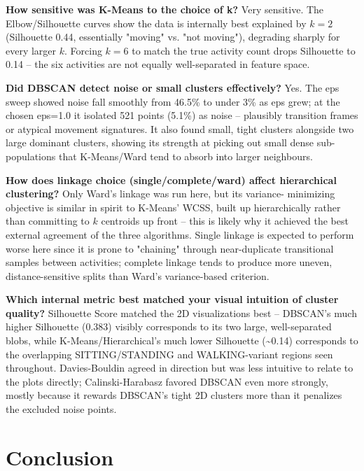 \documentclass[12pt,a4paper]{article}
\begin{document}
\textbf{How sensitive was K-Means to the choice of k?} Very sensitive. The
Elbow/Silhouette curves show the data is internally best explained by
\(k=2\) (Silhouette 0.44, essentially "moving" vs. "not moving"),
degrading sharply for every larger \(k\). Forcing \(k=6\) to match the true
activity count drops Silhouette to 0.14 -- the six activities are not
equally well-separated in feature space.

\textbf{Did DBSCAN detect noise or small clusters effectively?} Yes. The eps
sweep showed noise fall smoothly from 46.5\% to under 3\% as eps grew; at
the chosen eps=1.0 it isolated 521 points (5.1\%) as noise -- plausibly
transition frames or atypical movement signatures. It also found small,
tight clusters alongside two large dominant clusters, showing its
strength at picking out small dense sub-populations that K-Means/Ward
tend to absorb into larger neighbours.

\textbf{How does linkage choice (single/complete/ward) affect hierarchical
clustering?} Only Ward's linkage was run here, but its variance-
minimizing objective is similar in spirit to K-Means' WCSS, built up
hierarchically rather than committing to \(k\) centroids up front -- this
is likely why it achieved the best external agreement of the three
algorithms. Single linkage is expected to perform worse here since it is
prone to "chaining" through near-duplicate transitional samples between
activities; complete linkage tends to produce more uneven,
distance-sensitive splits than Ward's variance-based criterion.

\textbf{Which internal metric best matched your visual intuition of cluster
quality?} Silhouette Score matched the 2D visualizations best -- DBSCAN's
much higher Silhouette (0.383) visibly corresponds to its two large,
well-separated blobs, while K-Means/Hierarchical's much lower Silhouette
(\textasciitilde{}0.14) corresponds to the overlapping SITTING/STANDING and
WALKING-variant regions seen throughout. Davies-Bouldin agreed in
direction but was less intuitive to relate to the plots directly;
Calinski-Harabasz favored DBSCAN even more strongly, mostly because it
rewards DBSCAN's tight 2D clusters more than it penalizes the excluded
noise points.

\section{Conclusion}
\label{sec:orgfa05248}
\end{document}
